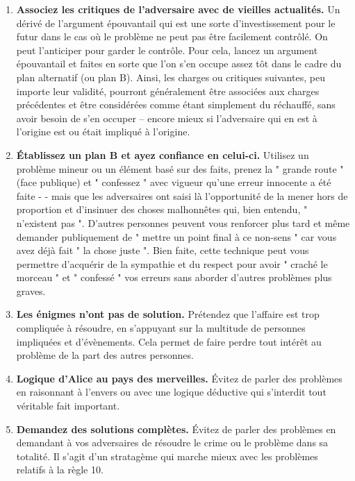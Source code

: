 \documentclass[11pt,twoside,a4paper]{article}
\begin{document}
\begin{enumerate}
	\item \textbf{Associez les critiques de l'adversaire avec de vieilles actualit{\'e}s. } Un d{\'e}riv{\'e} de l'argument {\'e}pouvantail qui est une sorte d'investissement pour le futur dans le cas o{\`u} le probl{\`e}me ne peut pas {\^e}tre facilement contr{\^o}l{\'e}. On peut l'anticiper pour garder le contr{\^o}le. Pour cela, lancez un argument {\'e}pouvantail et faites en sorte que l'on s'en occupe assez t{\^o}t dans le cadre du plan alternatif (ou plan B). Ainsi, les charges ou critiques suivantes, peu importe leur validit{\'e}, pourront g{\'e}n{\'e}ralement {\^e}tre associ{\'e}es aux charges pr{\'e}c{\'e}dentes et {\^e}tre consid{\'e}r{\'e}es comme {\'e}tant simplement du r{\'e}chauff{\'e}, sans avoir besoin de s'en occuper -- encore mieux si l'adversaire qui en est {\`a} l'origine est ou {\'e}tait impliqu{\'e} {\`a} l'origine.
	\item \textbf{{\'E}tablissez un plan B et ayez confiance en celui-ci. } Utilisez un probl{\`e}me mineur ou un {\'e}l{\'e}ment bas{\'e} sur des faits, prenez la " grande route " (face publique) et " confessez " avec vigueur qu'une erreur innocente a {\'e}t{\'e} faite - - mais que les adversaires ont saisi l{\`a} l'opportunit{\'e} de la mener hors de proportion et d'insinuer des choses malhonn{\^e}tes qui, bien entendu, " n'existent pas ". D'autres personnes peuvent vous renforcer plus tard et m{\^e}me demander publiquement de " mettre un point final {\`a} ce non-sens " car vous avez d{\'e}j{\`a} fait " la chose juste ". Bien faite, cette technique peut vous permettre d'acqu{\'e}rir de la sympathie et du respect pour avoir " crach{\'e} le morceau " et " confess{\'e} " vos erreurs sans aborder d'autres probl{\`e}mes plus graves.
	\item \textbf{Les {\'e}nigmes n'ont pas de solution. } Pr{\'e}tendez que l'affaire est trop compliqu{\'e}e {\`a} r{\'e}soudre, en s'appuyant sur la multitude de personnes impliqu{\'e}es et d'{\'e}v{\`e}nements. Cela permet de faire perdre tout int{\'e}r{\^e}t au probl{\`e}me de la part des autres personnes.
	\item \textbf{Logique d'Alice au pays des merveilles. } {\'E}vitez de parler des probl{\`e}mes en raisonnant {\`a} l'envers ou avec une logique d{\'e}ductive qui s'interdit tout v{\'e}ritable fait important.
	\item \textbf{Demandez des solutions compl{\`e}tes. } {\'E}vitez de parler des probl{\`e}mes en demandant {\`a} vos adversaires de r{\'e}soudre le crime ou le probl{\`e}me dans sa totalit{\'e}. Il s'agit d'un stratag{\`e}me qui marche mieux avec les probl{\`e}mes relatifs {\`a} la r{\`e}gle 10.

\end{enumerate}
\end{document}
